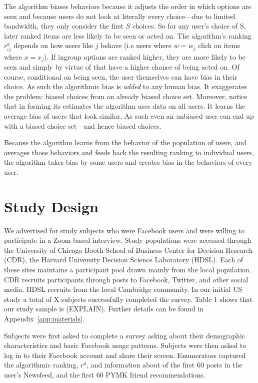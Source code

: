 \documentclass[12pt,letterpaper]{article}
\begin{document}
The algorithm biases behaviors because it adjusts the order in which options are seen and because users do not look at literally every choice---due to limited bandwidth, they only consider the first $S$ choices. So for any user's choice of S, later ranked items are less likely to be seen or acted on. The algorithm's ranking $r_{ij}^a$ depends on how users like $j$ behave (i.e users where $w =w_j$ click on items where $x=x_j$). If ingroup options are ranked higher, they are more likely to be seen and simply by virtue of that have a higher chance of being acted on. Of course, conditional on being seen, the user themselves can have bias in their choice. As such the algorithmic bias is {\em added} to any human bias. It exaggerates the problem: biased choices from an already biased choice set. Moreover, notice that in forming its estimates the algorithm uses data on all users. It learns the average bias of users that look similar. As such even an unbiased user can end up with a biased choice set---and hence biased choices. 

Because the algorithm learns from the behavior of the population of users, and averages those behaviors and feeds back the resulting ranking to individual users, the algorithm takes bias by some users and creates bias in the behaviors of every user.




\section{Study Design} 

We advertised for study subjects who were Facebook users and were willing to participate in a Zoom-based interview. Study populations were accessed through the University of Chicago Booth School of Business Center for Decision Research (CDR), the Harvard University Decision Science Laboratory (HDSL).  Each of these sites maintains a participant pool drawn mainly from the local population. CDR recruits participants through posts to Facebook, Twitter, and other social media. HDSL recruits from the local Cambridge community. 
In our initial US study a total of X subjects successfully completed the survey. Table 1 shows that our study sample is (EXPLAIN). Further details can be found in Appendix~\ref{app:materials}.

Subjects were first asked to complete a survey asking about their demographic characteristics and basic Facebook usage patterns. Subjects were then asked to log in to their Facebook account and share their screen. Enumerators captured the algorithmic ranking, $r^a$, and information about of the first 60 posts in the user's Newsfeed, and the first 60 PYMK friend recommendations. 
\end{document}
